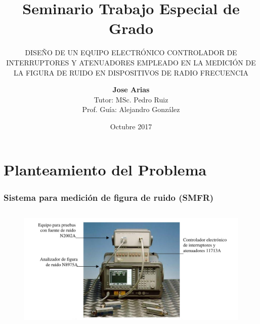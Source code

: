 \documentclass[xcolor=pdftext, table]{beamer}
\begin{document}
	\title{Seminario Trabajo Especial de Grado}
	
	\subtitle{\large DISEÑO DE UN EQUIPO ELECTRÓNICO CONTROLADOR DE
		INTERRUPTORES Y ATENUADORES EMPLEADO EN LA
		MEDICIÓN DE LA FIGURA DE RUIDO EN DISPOSITIVOS DE
		RADIO FRECUENCIA}
		
	\author{{\bf Jose Arias}\\
		{Tutor: MSc. Pedro Ruiz}\\
		{Prof. Guía: Alejandro González}}		
		
	
	\date{Octubre 2017}
	

	\frame{\titlepage}
	
	\section{Planteamiento del Problema}
	
	\begin{frame}
		\frametitle{Sistema para medición de figura de ruido (SMFR)}
	
		\begin{figure}[!h]
			\begin{center}
				\includegraphics[height=6cm]{Imagenes/SistemaMedicionFiguraRuido.pdf}			
			\end{center}	
		\end{figure}
	
	\end{frame}
\end{document}
